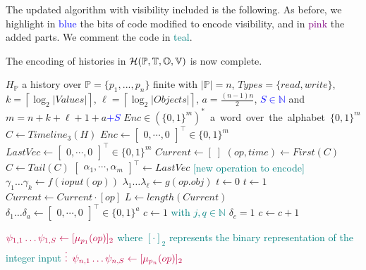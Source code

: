 \documentclass[12pt]{article}
\begin{document}
The updated algorithm with visibility included is the following. As before, we highlight in \textcolor{blue}{blue} the bits of code modified to encode visibility, and in \textcolor{purple}{pink} the added parts. We comment the code in \textcolor{teal}{teal}.

\vspace{1em}
The encoding of histories in $\mathcal{H}(\mathbb{P}, \mathbb{T}, \mathbb{O}, \mathbb{V})$ is now complete.


\begin{algorithm}[H]
\caption{Complete encoding}\label{alg:basicTimelineTypesValuesArVis}
\begin{algorithmic}[1]
\Require $H_\mathbb{P}$ a history over \mbox{$\mathbb{P}=\{p_1,...,p_n\}$} finite with $|\mathbb{P}|=n$, $Types=\{read,write\}$, \mbox{$k=\left\lceil \log_2 |Values| \right\rceil$}, \mbox{$\ell=\left\lceil \log_2 |Objects| \right\rceil$}, $a=\frac{(n-1)n}{2}$, \textcolor{blue}{$S\in\mathbb{N}$} and \mbox{$m=n+k+\ell+1+a$}\textcolor{blue}{$+S$}
\Ensure \mbox{$Enc\in(\{0,1\}^m)^*$ a word over the alphabet $\{0,1\}^m$}
\State $C \gets Timeline_3(H)$
\State $Enc \gets \begin{bmatrix} 0 , \cdots , 0 \end{bmatrix}^\top\in \{0,1\}^m $
\State $LastVec\gets \begin{bmatrix} 0 , \cdots , 0 \end{bmatrix}^\top\in \{0,1\}^m$
\State $Current\gets [\;]$
	\State $(op,time)\gets First(C)$
	\State $C\gets Tail(C)$	
	\State $\begin{bmatrix}\alpha_1 , \cdots  , \alpha_m\end{bmatrix}^\top \gets LastVec$
	 \textcolor{teal}{[new operation to encode]}
		\State $\gamma_1\hdots\gamma_k\gets f(ioput(op))$
		\State $\lambda_1\hdots\lambda_\ell\gets g(op.obj)$
			\State $t\gets 0$
		\Else
			\State $t\gets 1$
		\EndIf
		\State $Current\gets Current\cdot [op]$
		\State $L \gets length(Current)$
		\State $\delta_1\hdots \delta_a \gets \begin{bmatrix} 0 , \cdots , 0 \end{bmatrix}^\top\in \{0,1\}^a$
		\State $c \gets 1$
				 \quad \textcolor{teal}{ with $j,q\in \mathbb{N}$}
						\State $\delta_c=1$
					\EndIf
					\State $c\gets c+1$
				\EndFor
			\EndFor
		\EndIf
		
		\State $\textcolor{purple}{\psi_{1,1}\hdots\psi_{1,S}\gets[\mu_{p_1}(op)]_2}$ \quad \textcolor{teal}{where $[\cdot]_2$ represents the binary representation of the integer input}
		\State $\textcolor{purple}{\vdots}$
		\State $\textcolor{purple}{\psi_{n,1}\hdots\psi_{n,S}\gets[\mu_{p_n}(op)]_2}$
		

\end{algorithmic}
\end{algorithm}
\end{document}
